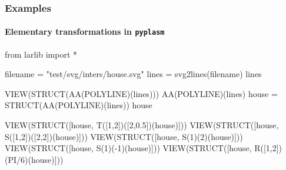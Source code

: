 \documentclass{beamer}
\begin{document}
\begin{frame}[fragile]
\frametitle{Examples}
\framesubtitle{Elementary transformations in \texttt{pyplasm}}

\begin{python}
from larlib import *

filename = "test/svg/inters/house.svg"
lines = svg2lines(filename)
lines

VIEW(STRUCT(AA(POLYLINE)(lines)))
AA(POLYLINE)(lines)
house = STRUCT(AA(POLYLINE)(lines))
house

VIEW(STRUCT([house, T([1,2])([2,0.5])(house)]))
VIEW(STRUCT([house, S([1,2])([2,2])(house)]))
VIEW(STRUCT([house, S(1)(2)(house)]))
VIEW(STRUCT([house, S(1)(-1)(house)]))
VIEW(STRUCT([house, R([1,2])(PI/6)(house)]))
\end{python}

\end{frame}
\end{document}
